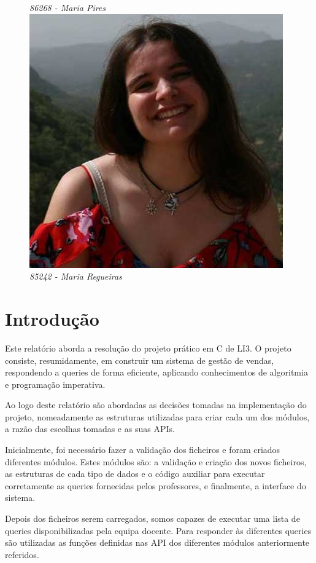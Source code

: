 \documentclass[a4paper]{report} %
\begin{document}
\begin{titlepage}
\begin{center}
\begin{figure}[!htb]
  \textit{86268 - Maria Pires}
\endminipage\hfill
{}%
  \includegraphics[width=\linewidth]{Pics/85242.jpg}
  \textit{85242 - Maria Regueiras}
\endminipage
\end{figure}

\vspace{2.0cm}

\end{center}
\end{titlepage}

\tableofcontents



\chapter{Introdução}

Este relatório aborda a resolução do projeto prático em C de LI3. O projeto consiste, resumidamente, em construir um sistema de gestão de vendas, respondendo a queries de forma eficiente, aplicando conhecimentos de algoritmia e programação imperativa.
\par Ao logo deste relatório são abordadas as decisões tomadas na implementação do projeto, nomeadamente as estruturas utilizadas para criar cada um dos módulos, a razão das escolhas tomadas e as suas APIs.
\par Inicialmente, foi necessário fazer a validação dos ficheiros e foram criados diferentes módulos. Estes módulos são: a validação e criação dos novos ficheiros, as estruturas de cada tipo de dados e o código auxiliar para executar corretamente as queries fornecidas pelos professores, e finalmente, a interface do sistema.
\par Depois dos ficheiros serem carregados, somos capazes de executar uma lista de queries disponibilizadas pela equipa docente. Para responder às diferentes queries são utilizadas as funções definidas nas API dos diferentes módulos anteriormente referidos.
\end{document}
